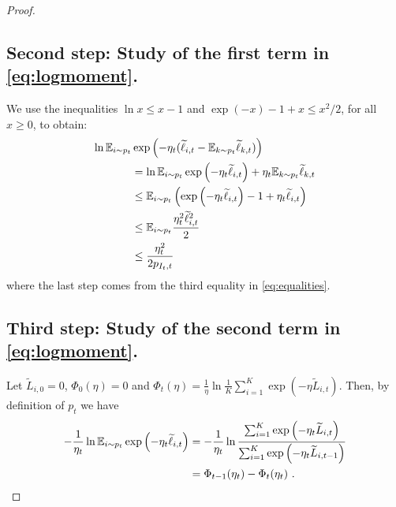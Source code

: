 \begin{proof}
\subsection*{Second step: Study of the first term in \eqref{eq:logmoment}.}
%
We use the inequalities $\ln x \leq x-1$ and $\exp(-x) - 1 + x \leq x^2/2$, for all $x \geq 0$, to obtain:
\begin{align}
\ln \mathbb{E}_{i \sim p_t} &\exp{\left(- \eta_t (\widetilde{\ell}_{i,t} - \mathbb{E}_{k \sim p_t} \widetilde{\ell}_{k,t}) \right)} \notag \\
& =  \ln \mathbb{E}_{i \sim p_t} \exp{\left(- \eta_t \widetilde{\ell}_{i,t}\right)} + \eta_t \mathbb{E}_{k \sim p_t} \widetilde{\ell}_{k,t} \notag \\
&\leq \mathbb{E}_{i \sim p_t} \left(\exp{\left(- \eta_t \widetilde{\ell}_{i,t}\right)} - 1 + \eta_t \widetilde{\ell}_{i,t} \right) \notag \\
&\leq \mathbb{E}_{i \sim p_t} \frac{\eta_t^2 \widetilde{\ell}_{i,t}^2}{2} \notag \\
&\leq \frac{\eta_t^2}{2 p_{I_t,t}} \label{eq:secondstep}
\end{align}
where the last step comes from the third equality in \eqref{eq:equalities}.

\subsection*{Third step: Study of the second term in \eqref{eq:logmoment}.}
%
Let $\tilde{L}_{i,0}=0$, $\Phi_0(\eta)=0$ and $\Phi_t(\eta) = \frac{1}{\eta} \ln \frac{1}{K} \sum_{i=1}^K \exp{\left(- \eta \tilde{L}_{i,t}\right)}$. Then, by definition of $p_t$ we have
\begin{align}
- \frac{1}{\eta_t} \ln \mathbb{E}_{i \sim p_t} \exp{\left(- \eta_t \widetilde{\ell}_{i,t} \right)} 
& = - \frac{1}{\eta_t} \ln \frac{\sum_{i=1}^K \exp{\left(- \eta_t \widetilde{L}_{i,t}\right)}}{\sum_{i=1}^K \exp{\left(- \eta_t \widetilde{L}_{i,t-1}\right)}} \notag \\
& = \Phi_{t-1}(\eta_t) - \Phi_{t}(\eta_t)~. \label{eq:thirdstep}
\end{align}


\end{proof}
